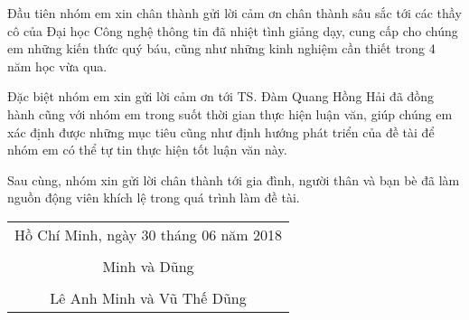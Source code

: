 \documentclass[./thesis.tex]{subfiles}
\begin{document}
Đầu tiên nhóm em xin chân thành gửi lời cảm ơn chân thành sâu sắc tới các thầy cô của Đại học Công nghệ thông tin đã nhiệt tình giảng dạy, cung cấp cho chúng em những kiến thức quý báu, cũng như những kinh nghiệm cần thiết trong 4 năm học vừa qua.

Đặc biệt nhóm em xin gửi lời cảm ơn tới TS. Đàm Quang Hồng Hải đã đồng hành cũng với nhóm em trong suốt thời gian thực hiện luận văn, giúp chúng em xác định được những mục tiêu cũng như định hướng phát triển của đề tài để nhóm em có thể tự tin thực hiện tốt luận văn này.

Sau cùng, nhóm xin gửi lời chân thành tới gia đình, người thân và bạn bè đã làm nguồn động viên khích lệ trong quá trình làm đề tài.

\hspace*{\fill}
\begin{tabular}{@{}c@{}} 

\\Hồ Chí Minh, ngày 30 tháng 06 năm 2018\\ \\
Minh và Dũng\\ \\
Lê Anh Minh và Vũ Thế Dũng
\end{tabular}
\end{document}
